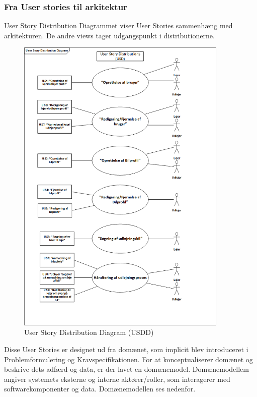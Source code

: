 \documentclass[Arkitektur/System_main.tex]{subfiles}
\begin{document}
\subsubsection{Fra User stories til arkitektur}
User Story Distribution Diagrammet viser User Stories sammenhæng med arkitekturen. De andre views tager udgangspunkt i distributionerne. 
\begin{figure}[H]
    \centering
    \includegraphics[width=0.90\textwidth]{Kravspecifikation/Funktionelle_krav/UserStories/graphics/USDD.png}
    \caption{User Story Distribution Diagram (USDD)}
    \label{fig:USDD}
\end{figure}
Disse User Stories er designet ud fra domænet, som implicit blev introduceret i Problemformulering og Kravspecifikationen. For at konceptualiserer domænet og beskrive dets adfærd og data, er der lavet en domænemodel. Domænemodellem angiver systemets eksterne og interne aktører/roller, som interagerer med softwarekomponenter og data. Domænemodellen ses nedenfor.
\end{document}
